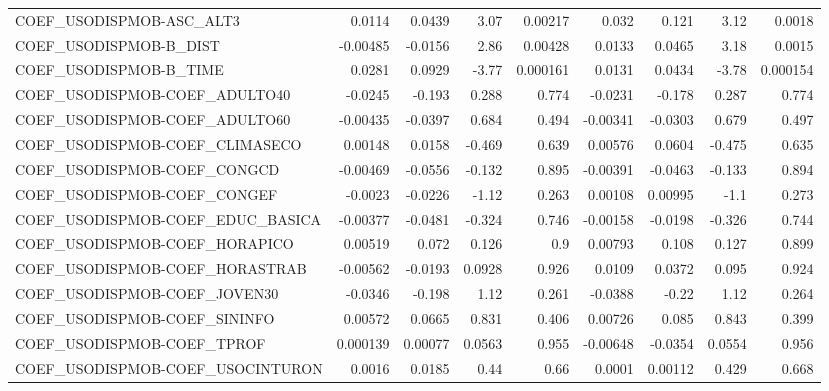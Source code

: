 \begin{tabular}{lrrrrrrrr}
COEF\_USODISPMOB-ASC\_ALT3          &      0.0114 &       0.0439 &    3.07 &  0.00217 &      0.032 &       0.121 &         3.12 &        0.0018 \\
COEF\_USODISPMOB-B\_DIST            &    -0.00485 &      -0.0156 &    2.86 &  0.00428 &     0.0133 &      0.0465 &         3.18 &        0.0015 \\
COEF\_USODISPMOB-B\_TIME            &      0.0281 &       0.0929 &   -3.77 & 0.000161 &     0.0131 &      0.0434 &        -3.78 &      0.000154 \\
COEF\_USODISPMOB-COEF\_ADULTO40     &     -0.0245 &       -0.193 &   0.288 &    0.774 &    -0.0231 &      -0.178 &        0.287 &         0.774 \\
COEF\_USODISPMOB-COEF\_ADULTO60     &    -0.00435 &      -0.0397 &   0.684 &    0.494 &   -0.00341 &     -0.0303 &        0.679 &         0.497 \\
COEF\_USODISPMOB-COEF\_CLIMASECO    &     0.00148 &       0.0158 &  -0.469 &    0.639 &    0.00576 &      0.0604 &       -0.475 &         0.635 \\
COEF\_USODISPMOB-COEF\_CONGCD       &    -0.00469 &      -0.0556 &  -0.132 &    0.895 &   -0.00391 &     -0.0463 &       -0.133 &         0.894 \\
COEF\_USODISPMOB-COEF\_CONGEF       &     -0.0023 &      -0.0226 &   -1.12 &    0.263 &    0.00108 &     0.00995 &         -1.1 &         0.273 \\
COEF\_USODISPMOB-COEF\_EDUC\_BASICA  &    -0.00377 &      -0.0481 &  -0.324 &    0.746 &   -0.00158 &     -0.0198 &       -0.326 &         0.744 \\
COEF\_USODISPMOB-COEF\_HORAPICO     &     0.00519 &        0.072 &   0.126 &      0.9 &    0.00793 &       0.108 &        0.127 &         0.899 \\
COEF\_USODISPMOB-COEF\_HORASTRAB    &    -0.00562 &      -0.0193 &  0.0928 &    0.926 &     0.0109 &      0.0372 &        0.095 &         0.924 \\
COEF\_USODISPMOB-COEF\_JOVEN30      &     -0.0346 &       -0.198 &    1.12 &    0.261 &    -0.0388 &       -0.22 &         1.12 &         0.264 \\
COEF\_USODISPMOB-COEF\_SININFO      &     0.00572 &       0.0665 &   0.831 &    0.406 &    0.00726 &       0.085 &        0.843 &         0.399 \\
COEF\_USODISPMOB-COEF\_TPROF        &    0.000139 &      0.00077 &  0.0563 &    0.955 &   -0.00648 &     -0.0354 &       0.0554 &         0.956 \\
COEF\_USODISPMOB-COEF\_USOCINTURON  &      0.0016 &       0.0185 &    0.44 &     0.66 &     0.0001 &     0.00112 &        0.429 &         0.668 \\
\bottomrule
\end{tabular}
